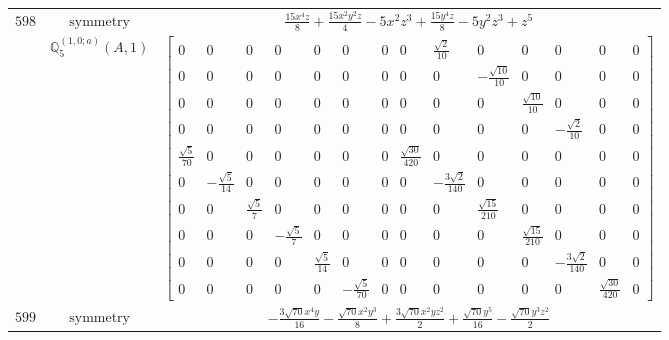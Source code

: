 \documentclass[fleqn,8pt,landscape]{jsarticle}
\begin{document}
\begin{longtable}{ccc}
$ 598 $ & $ \text{symmetry} $ & $ \frac{15 x^{4} z}{8} + \frac{15 x^{2} y^{2} z}{4} - 5 x^{2} z^{3} + \frac{15 y^{4} z}{8} - 5 y^{2} z^{3} + z^{5} $ \\
$  $ & $ \mathbb{Q}_{5}^{(1,0;a)}(A,1) $ & $ \begin{bmatrix} 0 & 0 & 0 & 0 & 0 & 0 & 0 & 0 & \frac{\sqrt{2}}{10} & 0 & 0 & 0 & 0 & 0 \\ 0 & 0 & 0 & 0 & 0 & 0 & 0 & 0 & 0 & - \frac{\sqrt{10}}{10} & 0 & 0 & 0 & 0 \\ 0 & 0 & 0 & 0 & 0 & 0 & 0 & 0 & 0 & 0 & \frac{\sqrt{10}}{10} & 0 & 0 & 0 \\ 0 & 0 & 0 & 0 & 0 & 0 & 0 & 0 & 0 & 0 & 0 & - \frac{\sqrt{2}}{10} & 0 & 0 \\ \frac{\sqrt{5}}{70} & 0 & 0 & 0 & 0 & 0 & 0 & \frac{\sqrt{30}}{420} & 0 & 0 & 0 & 0 & 0 & 0 \\ 0 & - \frac{\sqrt{5}}{14} & 0 & 0 & 0 & 0 & 0 & 0 & - \frac{3 \sqrt{2}}{140} & 0 & 0 & 0 & 0 & 0 \\ 0 & 0 & \frac{\sqrt{5}}{7} & 0 & 0 & 0 & 0 & 0 & 0 & \frac{\sqrt{15}}{210} & 0 & 0 & 0 & 0 \\ 0 & 0 & 0 & - \frac{\sqrt{5}}{7} & 0 & 0 & 0 & 0 & 0 & 0 & \frac{\sqrt{15}}{210} & 0 & 0 & 0 \\ 0 & 0 & 0 & 0 & \frac{\sqrt{5}}{14} & 0 & 0 & 0 & 0 & 0 & 0 & - \frac{3 \sqrt{2}}{140} & 0 & 0 \\ 0 & 0 & 0 & 0 & 0 & - \frac{\sqrt{5}}{70} & 0 & 0 & 0 & 0 & 0 & 0 & \frac{\sqrt{30}}{420} & 0 \end{bmatrix} $ \\ \hline
$ 599 $ & $ \text{symmetry} $ & $ - \frac{3 \sqrt{70} x^{4} y}{16} - \frac{\sqrt{70} x^{2} y^{3}}{8} + \frac{3 \sqrt{70} x^{2} y z^{2}}{2} + \frac{\sqrt{70} y^{5}}{16} - \frac{\sqrt{70} y^{3} z^{2}}{2} $ \\

\end{longtable}
\end{document}
